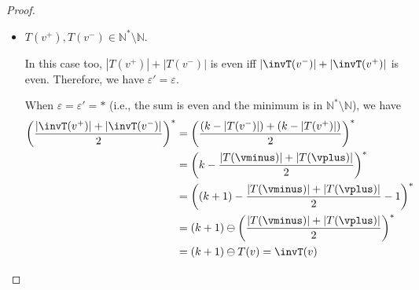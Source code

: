 \documentclass{theoretics}
\newcommand{\Nat}{\mathbb{N}}
\newcommand{\Natstro}{\mathbb{N}^* \setminus \mathbb{N}}
\newcommand{\eps}{\varepsilon}
\DeclarePairedDelimiter{\adjustfloor}{\lfloor}{\rfloor}
\newcommand{\floor}[1]{\adjustfloor*{#1}}
\begin{document}
\begin{proof}
\begin{itemize}
		First, from Observation~\ref{obs: property}, we have \(\invT(\vminus), \invT(\vplus) \in \Nat\) as well. 
		
		Thus, it is enough to discuss the two cases corresponding to when the sum is even or odd, respectively. 
		Note that  \(|T(v^+)|+|T(v^-)|\) is even iff \(|\invT(v^-)|+|\invT(v^+)|\) is even, simply because in this case \(\invT(\vplus) = (k+1) - T(\vplus)\) and \(\invT(\vminus) = (k+1) - T(\vminus)\). 
		It follows that irrespective of whether \(|T(\vminus)| + |T(\vplus)|\) is odd or even, we have \(\eps' = \eps\). 
		
		\smallskip
		
		When \(\eps = \eps' = 0\) (i.e., the sum is even), we have
		\begin{align*}
			\frac{|\invT(v^+)|+|\invT(v^-)|}{2} &= \frac{(k+1 - |T(v^-)|) + (k+1 - |T(v^+)|)}{2}\\
			&=k+1 - \frac{\sumT}{2}\\
			&= (k+1) - T(v) = \invT(v) 
		\end{align*}
		
		When \(\eps = \eps' = 0^*\) (i.e., the sum is odd), 
		we have 
		\begin{align*}
			\left(\floor{\frac{|\invT(v^+)|+|\invT(v^-)|}{2}}\right)^* &= \left(\floor{k+1 - \frac{\sumT}{2}}\right)^*\\
			&= \left(k+1 - \floor{\frac{\sumT}{2}} - 1\right)^*\\
			&= (k+1) \ominus \left(\floor{\frac{\sumT}{2}}\right)^*\\
			&= (k+1) \ominus T(v) = \invT(v) 
		\end{align*}
	
		\smallskip
		
		\item \(T(v^+), T(v^-) \in \Natstro\).
		
		In this case too, \(|T(v^+)|+|T(v^-)|\) is even iff  \(|\invT(v^-)|+|\invT(v^+)|\) is even.
		Therefore, we have \(\eps' = \eps\).
		
		When \(\eps = \eps' = *\) (i.e., the sum is even and the minimum is in \(\Natstro\)), we have 
		\begin{align*}
			\left(\frac{|\invT(v^+)|+|\invT(v^-)|}{2}\right)^* &= \left(\frac{(k - |T(v^-)|)+(k - |T(v^+)|)}{2}\right)^*\\
			&= \left(k - \frac{|T(\vminus)| + |T(\vplus)|}{2}\right)^* \\
			&= \left((k+1) - \frac{|T(\vminus)| + |T(\vplus)|}{2} - 1\right)^*\\
			&= (k+1) \ominus \left(\frac{|T(\vminus)| + |T(\vplus)|}{2}\right)^*\\
			&= (k+1) \ominus T(v) = \invT(v) 
		\end{align*}
		

\end{itemize}
\end{proof}
\end{document}
